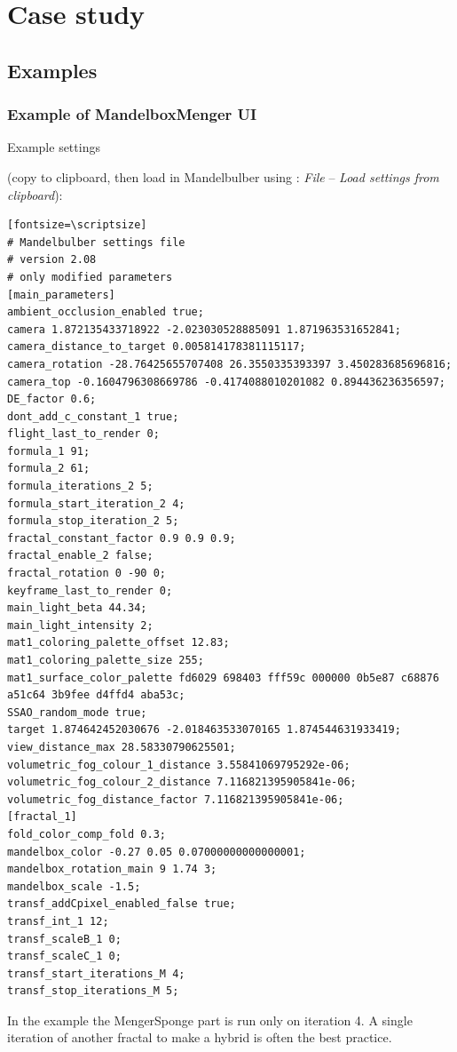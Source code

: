 \section{Case study}\label{case-study}
\subsection{Examples}\label{examples}
\subsubsection{Example of MandelboxMenger UI}\label{example-of-mandelboxmenger-ui}

Example settings

(copy to clipboard, then load in Mandelbulber using : \emph{File} -- \emph{Load settings from clipboard}):

\begin{verbatim}[fontsize=\scriptsize]
# Mandelbulber settings file
# version 2.08
# only modified parameters
[main_parameters]
ambient_occlusion_enabled true;
camera 1.872135433718922 -2.023030528885091 1.871963531652841;
camera_distance_to_target 0.005814178381115117;
camera_rotation -28.76425655707408 26.3550335393397 3.450283685696816;
camera_top -0.1604796308669786 -0.4174088010201082 0.894436236356597;
DE_factor 0.6;
dont_add_c_constant_1 true;
flight_last_to_render 0;
formula_1 91;
formula_2 61;
formula_iterations_2 5;
formula_start_iteration_2 4;
formula_stop_iteration_2 5;
fractal_constant_factor 0.9 0.9 0.9;
fractal_enable_2 false;
fractal_rotation 0 -90 0;
keyframe_last_to_render 0;
main_light_beta 44.34;
main_light_intensity 2;
mat1_coloring_palette_offset 12.83;
mat1_coloring_palette_size 255;
mat1_surface_color_palette fd6029 698403 fff59c 000000 0b5e87 c68876 a51c64 3b9fee d4ffd4 aba53c;
SSAO_random_mode true;
target 1.874642452030676 -2.018463533070165 1.874544631933419;
view_distance_max 28.58330790625501;
volumetric_fog_colour_1_distance 3.55841069795292e-06;
volumetric_fog_colour_2_distance 7.116821395905841e-06;
volumetric_fog_distance_factor 7.116821395905841e-06;
[fractal_1]
fold_color_comp_fold 0.3;
mandelbox_color -0.27 0.05 0.07000000000000001;
mandelbox_rotation_main 9 1.74 3;
mandelbox_scale -1.5;
transf_addCpixel_enabled_false true;
transf_int_1 12;
transf_scaleB_1 0;
transf_scaleC_1 0;
transf_start_iterations_M 4;
transf_stop_iterations_M 5;
\end{verbatim}


In the example the MengerSponge part is run only on iteration 4. A single
iteration of another fractal to make a hybrid is often the best practice.

